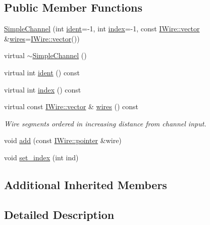 \subsection*{Public Member Functions}
\begin{DoxyCompactItemize}
\item 
\hyperlink{class_wire_cell_1_1_simple_channel_abee02dd46dcba8e9eb707ba0ecc50658}{Simple\+Channel} (int \hyperlink{class_wire_cell_1_1_simple_channel_a778b1796236fda53b95214f0e60d310a}{ident}=-\/1, int \hyperlink{class_wire_cell_1_1_simple_channel_af16019937e1b8fb48860f405c4607757}{index}=-\/1, const \hyperlink{class_wire_cell_1_1_i_data_ae1a9f863380499bb43f39fabb6276660}{I\+Wire\+::vector} \&\hyperlink{class_wire_cell_1_1_simple_channel_a4e3b8a6e1f4d2ac98b532bb79aaaa6ef}{wires}=\hyperlink{class_wire_cell_1_1_i_data_ae1a9f863380499bb43f39fabb6276660}{I\+Wire\+::vector}())
\item 
virtual \hyperlink{class_wire_cell_1_1_simple_channel_ad3b599464d652e3128f7f43bace39082}{$\sim$\+Simple\+Channel} ()
\item 
virtual int \hyperlink{class_wire_cell_1_1_simple_channel_a778b1796236fda53b95214f0e60d310a}{ident} () const
\item 
virtual int \hyperlink{class_wire_cell_1_1_simple_channel_af16019937e1b8fb48860f405c4607757}{index} () const
\item 
virtual const \hyperlink{class_wire_cell_1_1_i_data_ae1a9f863380499bb43f39fabb6276660}{I\+Wire\+::vector} \& \hyperlink{class_wire_cell_1_1_simple_channel_a4e3b8a6e1f4d2ac98b532bb79aaaa6ef}{wires} () const
\begin{DoxyCompactList}\small\item\em Wire segments ordered in increasing distance from channel input. \end{DoxyCompactList}\item 
void \hyperlink{class_wire_cell_1_1_simple_channel_a30231e9c13ed9ee19fbd84aa2c94be08}{add} (const \hyperlink{class_wire_cell_1_1_i_data_aff870b3ae8333cf9265941eef62498bc}{I\+Wire\+::pointer} \&wire)
\item 
void \hyperlink{class_wire_cell_1_1_simple_channel_af41051f35a8568c3da51dd28821c3330}{set\+\_\+index} (int ind)
\end{DoxyCompactItemize}
\subsection*{Additional Inherited Members}


\subsection{Detailed Description}


